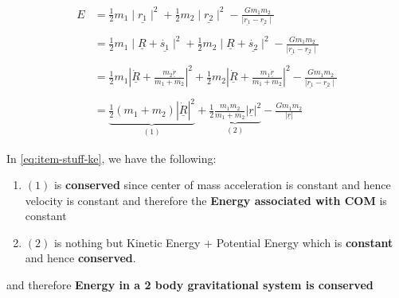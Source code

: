 \begin{align*}
	E & = \frac{1}{2}m_{1}\mid \underline{r_{1}} \mid^{2} + \frac{1}{2}m_{2} \mid \underline{r_{2}} \mid^{2} - \frac{Gm_{1}m_{2}}{\mid \underline{r_{1}} - \underline{r_{2}} \mid}                                                                                        \\ \\
	  & = \frac{1}{2}m_{1} \mid \underline{R} + \underline{\dot{s_{1}}} \mid^{2} +  \frac{1}{2}m_{2} \mid \underline{R} + \underline{\dot{s_{2}}} \mid^{2} - \frac{Gm_{1}m_{2}}{\mid \underline{r_{1}} - \underline{r_{2}} \mid}                                          \\ \\
	  & = \frac{1}{2}m_{1} \left| \underline{\dot{R}} + \frac{m_{2}\underline{\dot{r}}}{m_{1} + m_{2}} \right|^{2}
	+ \frac{1}{2} m_{2}\left| \underline{\dot{R}} + \frac{m_{1}\underline{\dot{r}}}{m_{1} + m_{2}} \right|^{2}
	- \frac{Gm_{1}m_{2}}{\mid \underline{r_{1}} - \underline{r_{2}} \mid}                                                                                                                                                                                                 \\ \\
	  & =  \underbrace{\frac{1}{2}(m_{1} + m_{2})\left| \underline{\dot{R}} \right|^{2}}_{(1)} + \underbrace{\frac{1}{2}\frac{m_{1}m_{2}}{m_{1} + m_{2}}\left| \underline{r} \right|^{2}}_{(2)} - \frac{Gm_{1}m_{2}}{|\underline{r}|} \tag{$*G$} \label{eq:item-stuff-ke}
\end{align*}

\clearpage

In \eqref{eq:item-stuff-ke}, we have the following:
\begin{enumerate}
	\item $(1)$ is {\bf conserved} since center of mass acceleration is
	      constant and hence velocity is constant and therefore the {\bf Energy
			      associated with COM} is constant
	\item $(2)$ is nothing but Kinetic Energy + Potential Energy which is
		      {\bf constant} and hence {\bf conserved}.
\end{enumerate}
and therefore {\bf Energy in a 2 body gravitational system is conserved}

